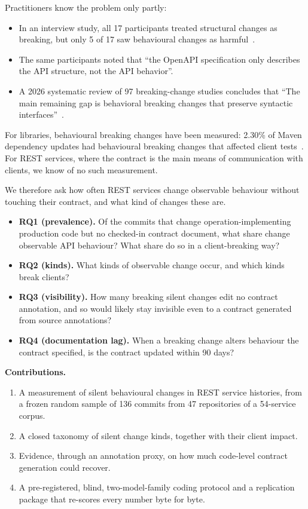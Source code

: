 \documentclass[conference]{IEEEtran}
\begin{document}
Practitioners know the problem only partly:
\begin{itemize}
\item In an interview study, all 17 participants treated structural changes as breaking, but only 5 of 17 saw behavioural changes as harmful~\cite{lercher2024evolution}.
\item The same participants noted that ``the OpenAPI specification only describes the API structure, not the API behavior''.
\item A 2026 systematic review of 97 breaking-change studies concludes that ``The main remaining gap is behavioral breaking changes that preserve syntactic interfaces''~\cite{chen2026slr}.
\end{itemize}

For libraries, behavioural breaking changes have been measured: 2.30\% of Maven dependency updates had behavioural breaking changes that affected client tests~\cite{jayasuriya2024behavioral}. For REST services, where the contract is the main means of communication with clients, we know of no such measurement.

We therefore ask how often REST services change observable behaviour without touching their contract, and what kind of changes these are.

\begin{itemize}
\item \textbf{RQ1 (prevalence).} Of the commits that change operation-implementing production code but no checked-in contract document, what share change observable API behaviour? What share do so in a client-breaking way?
\item \textbf{RQ2 (kinds).} What kinds of observable change occur, and which kinds break clients?
\item \textbf{RQ3 (visibility).} How many breaking silent changes edit no contract annotation, and so would likely stay invisible even to a contract generated from source annotations?
\item \textbf{RQ4 (documentation lag).} When a breaking change alters behaviour the contract specified, is the contract updated within 90 days?
\end{itemize}

\textbf{Contributions.}
\begin{enumerate}
\item A measurement of silent behavioural changes in REST service histories, from a frozen random sample of 136 commits from 47 repositories of a 54-service corpus.
\item A closed taxonomy of silent change kinds, together with their client impact.
\item Evidence, through an annotation proxy, on how much code-level contract generation could recover.
\item A pre-registered, blind, two-model-family coding protocol and a replication package that re-scores every number byte for byte.
\end{enumerate}
\end{document}
